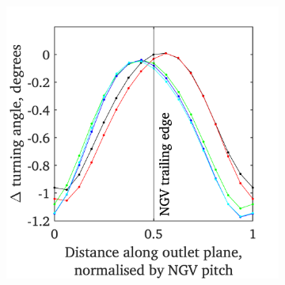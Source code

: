 \documentclass[a4paper, 11pt, oneside]{report}
\begin{document}
\begin{figure}[H]
\begin{subfigure}{.45\textwidth}
		\includegraphics[width=\linewidth]{figs/ps_cutbacks_turning_angle_surveys.png}
	\end{subfigure}
	\begin{subfigure}{.1125\textwidth}
		\centering

\end{subfigure}
\end{figure}
\end{document}
